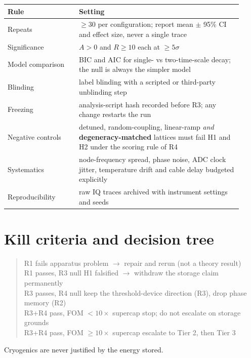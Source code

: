 \documentclass[11pt,a4paper]{article}
\begin{document}
\begin{table}[h]
\centering
\small
\begin{tabular}{@{}p{0.28\linewidth}p{0.64\linewidth}@{}}
\toprule
Rule & Setting \\
\midrule
Repeats & $\ge30$ per configuration; report mean $\pm$ 95\% CI and effect size, never a single trace \\
Significance & $A>0$ and $R\ge10$ each at $\ge5\sigma$ \\
Model comparison & BIC and AIC for single- vs two-time-scale decay; the null is always the simpler
model \\
Blinding & label blinding with a scripted or third-party unblinding step \\
Freezing & analysis-script hash recorded before R3; any change restarts the run \\
Negative controls & detuned, random-coupling, linear-ramp \emph{and} \textbf{degeneracy-matched}
lattices must fail H1 and H2 under the scoring rule of R4 \\
Systematics & node-frequency spread, phase noise, ADC clock jitter, temperature drift and cable
delay budgeted explicitly \\
Reproducibility & raw IQ traces archived with instrument settings and seeds \\
\bottomrule
\end{tabular}
\end{table}

\section{Kill criteria and decision tree}

\begin{quote}\ttfamily\small
R1 fails \hfill apparatus problem $\to$ repair and rerun (not a theory result)\\
R1 passes, R3 null \hfill H1 falsified $\to$ withdraw the storage claim permanently\\
R3 passes, R4 null \hfill keep the threshold-device direction (R3), drop phase memory (R2)\\
R3+R4 pass, FOM $<10\times$ supercap \hfill stop; do not escalate on storage grounds\\
R3+R4 pass, FOM $\ge10\times$ supercap \hfill escalate to Tier 2, then Tier 3
\end{quote}

\noindent Cryogenics are never justified by the energy stored.
\end{document}
